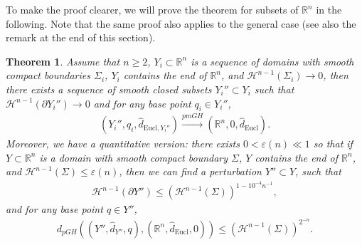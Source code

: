 \documentclass[letter]{amsart}
\newtheorem{thm}{Theorem}[section]
\theoremstyle{definition}
\theoremstyle{remark}
\begin{document}
To make the proof clearer, we will prove the theorem for subsets of $\mathbb{R}^n$ in the following. Note that the same proof also applies to the general case (see also the remark at the end of this section). 

\begin{thm}
	Assume that $n \geq 2$, $Y_i \subset \mathbb{R}^n$ is a sequence of domains with smooth compact boundaries $\Sigma _i$, $Y_i$ contains the end of $\mathbb{R}^n$, and  $\mathcal{H}^{n-1}(\Sigma _i) \to 0$, then there exists a sequence of smooth closed subsets $Y_i'' \subset Y_i$ such that $\mathcal{H}^{n-1}(\partial Y_i'') \to 0$ and for any base point $q_i \in Y_i''$,
	\begin{align*}
		(Y_i'', q_i, \hat{d}_{\mathrm{Eucl}, Y_i''}) \xrightarrow{pmGH} (\mathbb{R}^n, 0, \hat{d}_{\mathrm{Eucl}}). 
	\end{align*}
Moreover, we have a quantitative version: there exists $ 0< \varepsilon (n) \ll 1$ so that if $Y \subset \mathbb{R}^n$ is a domain with smooth compact boundary $\Sigma $, $Y$ contains the end of $\mathbb{R}^n$, and $\mathcal{H}^{n-1}(\Sigma ) \leq \varepsilon(n) $, then we can find a perturbation $Y'' \subset Y$, such that 
\begin{align}
	\mathcal{H}^{n-1}(\partial Y'') \leq (\mathcal{H}^{n-1}(\Sigma ) ) ^{ 1- 10^{-4}n^{-1}},
\end{align}
and for any base point $q \in Y''$,
\begin{align}\label{explicit error}
	d_{pGH}( (Y'', \hat{d}_{Y''}, q), (\mathbb{R}^n, \hat{d}_{\mathrm{Eucl}},0) ) \leq (\mathcal{H}^{n-1}(\Sigma ) )^{2^{-n}}.
\end{align}
\end{thm}
\end{document}
